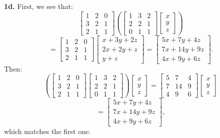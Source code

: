 \documentclass{article}
\begin{document}
\textbf{1d.} First, we see that:
$$\begin{bmatrix}
    1 & 2 & 0 \\
    3 & 2 & 1 \\
    2 & 1 & 1
\end{bmatrix}\left(
\begin{bmatrix}
    1 & 3 & 2 \\
    2 & 2 & 1 \\
    0 & 1 & 1
\end{bmatrix}
\begin{bmatrix}
    x \\
    y \\
    z
\end{bmatrix}\right)$$
$$= \begin{bmatrix}
    1 & 2 & 0 \\
    3 & 2 & 1 \\
    2 & 1 & 1
\end{bmatrix}
\begin{bmatrix}
    x + 3y + 2z \\
    2x + 2y + z \\
    y + z
\end{bmatrix}
= \begin{bmatrix}
    5x + 7y + 4z \\
    7x + 14y + 9z \\
    4x + 9y + 6z
\end{bmatrix}.$$
Then:
$$\left(\begin{bmatrix}
    1 & 2 & 0 \\
    3 & 2 & 1 \\
    2 & 1 & 1
\end{bmatrix}
\begin{bmatrix}
    1 & 3 & 2 \\
    2 & 2 & 1 \\
    0 & 1 & 1
\end{bmatrix}\right)
\begin{bmatrix}
    x \\
    y \\
    z
\end{bmatrix}
= \begin{bmatrix}
    5 & 7 & 4 \\
    7 & 14 & 9 \\
    4 & 9 & 6
\end{bmatrix}
\begin{bmatrix}
    x \\
    y \\
    z
\end{bmatrix}$$
$$= \begin{bmatrix}
    5x + 7y + 4z \\
    7x + 14y + 9z \\
    4x + 9y + 6z
\end{bmatrix},$$
which matches the first one. \\
\end{document}

